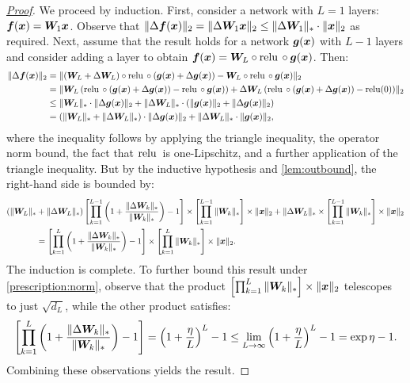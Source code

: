 \archbounds*
\begin{proof}[\mbox{\hyperref[lem:deep_perturbation_bounds]{Proof}}]\label{proof:archbounds} We proceed by induction. First, consider a network with $L=1$ layers: ${\bm{f}}({\bm{x}}) = {\bm{W}}_1 {\bm{x}}$. Observe that $\Vert {\Delta {\bm{f}}({\bm{x}})} \Vert_2 = \Vert {\Delta {\bm{W}}_1 {\bm{x}}} \Vert_2 \leq \Vert {\Delta {\bm{W}}_1} \Vert_*\cdot \Vert {{\bm{x}}} \Vert_2$ as required. Next, assume that the result holds for a network ${\bm{g}}({\bm{x}})$ with $L-1$ layers and consider adding a layer to obtain ${\bm{f}}({\bm{x}}) = {\bm{W}}_L\circ \operatorname{relu}{}\circ {\bm{g}}({\bm{x}})$. Then:
\begin{align*}
    \Vert {\Delta {\bm{f}}({\bm{x}})} \Vert_2 &= \Vert {({\bm{W}}_L+\Delta {\bm{W}}_L)\circ \operatorname{relu}{} \circ ({\bm{g}}({\bm{x}})+\Delta {\bm{g}}({\bm{x}})) - {\bm{W}}_L \circ \operatorname{relu}{} \circ {\bm{g}}({\bm{x}})} \Vert_2 \\ 
    &= \Vert {{\bm{W}}_L \left(\operatorname{relu}{} \circ ({\bm{g}}({\bm{x}})+\Delta
    {\bm{g}}({\bm{x}})) - \operatorname{relu}{} \circ {\bm{g}}({\bm{x}})\right) + \Delta {\bm{W}}_L \left( \operatorname{relu}{} \circ ({\bm{g}}({\bm{x}})+\Delta {\bm{g}}({\bm{x}})) - \operatorname{relu}(0)\right)} \Vert_2 \\
    &\leq \Vert {{\bm{W}}_L} \Vert_*\cdot\Vert {\Delta {\bm{g}}({\bm{x}})} \Vert_2 + \Vert {\Delta {\bm{W}}_L} \Vert_*\cdot(\Vert {{\bm{g}}({\bm{x}})} \Vert_2 + \Vert {\Delta {\bm{g}}({\bm{x}})} \Vert_2)\\
    &= (\Vert {{\bm{W}}_L} \Vert_*+\Vert {\Delta {\bm{W}}_L} \Vert_*)\cdot \Vert {\Delta {\bm{g}}({\bm{x}})} \Vert_2 + \Vert {\Delta {\bm{W}}_L} \Vert_*\cdot \Vert {{\bm{g}}({\bm{x}})} \Vert_2,
    \end{align*}
    where the inequality follows by applying the triangle inequality, the operator norm bound, the fact that $\operatorname{relu}{}$ is one-Lipschitz, and a further application of the triangle inequality. But by the inductive hypothesis and \cref{lem:outbound}, the right-hand side is bounded by:
    \begin{align*}
    (\Vert {{\bm{W}}_L} \Vert_*&+\Vert {\Delta {\bm{W}}_L} \Vert_*) \left[ \prod_{k = 1}^{L-1} \left( 1 + \frac{\Vert \Delta {\bm{W}}_k \Vert_{*}}{\Vert {\bm{W}}_k \Vert_{*}}\right)  - 1 \right] \times \left[\prod_{k=1}^{L-1} \Vert {{\bm{W}}_k} \Vert_* \right] \times \Vert {{\bm{x}}} \Vert_2 + \Vert {\Delta {\bm{W}}_L} \Vert_* \times \left[\prod_{k=1}^{L-1} \Vert {{\bm{W}}_k} \Vert_* \right] \times \Vert {{\bm{x}}} \Vert_2\\
    &= \left[ \prod_{k = 1}^L \left( 1 + \frac{\Vert \Delta {\bm{W}}_k \Vert_{*}}{\Vert {\bm{W}}_k \Vert_{*}}\right)  - 1 \right] \times \left[\prod_{k=1}^L \Vert {{\bm{W}}_k} \Vert_* \right] \times \Vert {{\bm{x}}} \Vert_2.
\end{align*}
The induction is complete. To further bound this result under \cref{prescription:norm}, observe that the product $\left[\prod_{k=1}^L \Vert {{\bm{W}}_k} \Vert_* \right] \times \Vert {{\bm{x}}} \Vert_2$ telescopes to just $\sqrt{d_L}$, while the other product satisfies:
\begin{equation*}
    \left[ \prod_{k = 1}^L \left( 1 + \frac{\Vert \Delta {\bm{W}}_k \Vert_{*}}{\Vert {\bm{W}}_k \Vert_{*}}\right)  - 1 \right] = \left(1+\frac{\eta}{L}\right)^L -1 \leq \lim_{L\to\infty}\left(1+\frac{\eta}{L}\right)^L-1 = \exp\eta - 1.
\end{equation*}
Combining these observations yields the result.
\end{proof}

